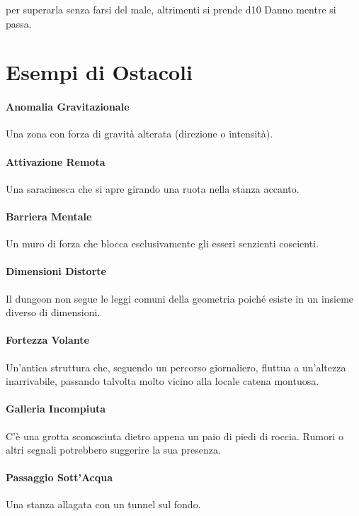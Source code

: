 \documentclass[itdr]{subfiles}
\begin{document}
 per superarla senza farsi del male, altrimenti si prende d10 Danno mentre si passa.

\vfill
\break

\section{Esempi di Ostacoli}

\paragraph{Anomalia Gravitazionale}
Una zona con forza di gravità alterata (direzione o intensità).

\vfill
\paragraph{Attivazione Remota}
Una saracinesca che si apre girando una ruota nella stanza accanto.

\vfill
\paragraph{Barriera Mentale}
Un muro di forza che blocca esclusivamente gli esseri senzienti coscienti.

\vfill
\paragraph{Dimensioni Distorte}
Il dungeon non segue le leggi comuni della geometria poiché esiste in un insieme diverso di dimensioni.

\vfill
\paragraph{Fortezza Volante}
Un'antica struttura che, seguendo un percorso giornaliero, fluttua a un'altezza inarrivabile, passando talvolta molto vicino alla locale catena montuosa.

\vfill
\paragraph{Galleria Incompiuta}
C'è una grotta sconosciuta dietro appena un paio di piedi di roccia. Rumori o altri segnali potrebbero suggerire la sua presenza.

\vfill
\paragraph{Passaggio Sott'Acqua}
Una stanza allagata con un tunnel sul fondo.
\end{document}

